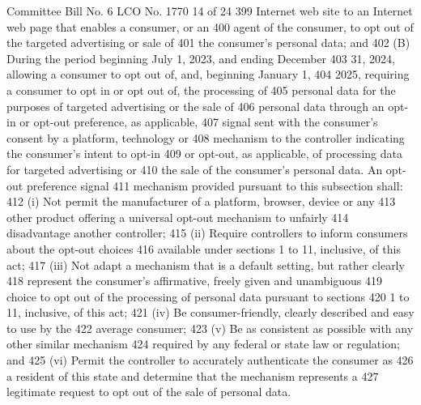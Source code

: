 Committee Bill No. 6
LCO No. 1770 14 of 24
399 Internet web site to an Internet web page that enables a consumer, or an
400 agent of the consumer, to opt out of the targeted advertising or sale of
401 the consumer's personal data; and
402 (B) During the period beginning July 1, 2023, and ending December
403 31, 2024, allowing a consumer to opt out of, and, beginning January 1,
404 2025, requiring a consumer to opt in or opt out of, the processing of
405 personal data for the purposes of targeted advertising or the sale of
406 personal data through an opt-in or opt-out preference, as applicable,
407 signal sent with the consumer's consent by a platform, technology or
408 mechanism to the controller indicating the consumer's intent to opt-in
409 or opt-out, as applicable, of processing data for targeted advertising or
410 the sale of the consumer's personal data. An opt-out preference signal
411 mechanism provided pursuant to this subsection shall:
412 (i) Not permit the manufacturer of a platform, browser, device or any
413 other product offering a universal opt-out mechanism to unfairly
414 disadvantage another controller;
415 (ii) Require controllers to inform consumers about the opt-out choices
416 available under sections 1 to 11, inclusive, of this act;
417 (iii) Not adapt a mechanism that is a default setting, but rather clearly
418 represent the consumer's affirmative, freely given and unambiguous
419 choice to opt out of the processing of personal data pursuant to sections
420 1 to 11, inclusive, of this act;
421 (iv) Be consumer-friendly, clearly described and easy to use by the
422 average consumer;
423 (v) Be as consistent as possible with any other similar mechanism
424 required by any federal or state law or regulation; and
425 (vi) Permit the controller to accurately authenticate the consumer as
426 a resident of this state and determine that the mechanism represents a
427 legitimate request to opt out of the sale of personal data.

